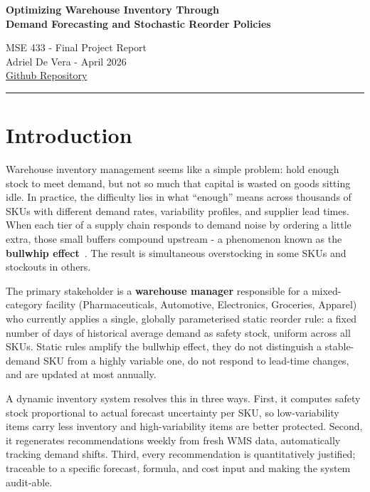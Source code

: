 \documentclass[11pt,letterpaper]{article}
\begin{document}
\begin{center}
{\LARGE\bfseries Optimizing Warehouse Inventory Through\\[4pt]
Demand Forecasting and Stochastic Reorder Policies\par}
\vspace{8pt}
{\large MSE 433 - Final Project Report}\\[4pt]
{\normalsize Adriel De Vera - April 2026}\\[2pt]
\href{https://github.com/AdrielDeVera/mse-433-final}{Github Repository}
\end{center}
\vspace{0.3em}
\hrule
\vspace{1em}


\section{Introduction}
\label{sec:intro}

Warehouse inventory management seems like a simple problem: hold enough stock to meet demand, but not so much that capital is wasted on goods sitting idle. In practice, the difficulty lies in what ``enough'' means across thousands of SKUs with different demand rates, variability profiles, and supplier lead times. When each tier of a supply chain responds to demand noise by ordering a little extra, those small buffers compound upstream - a phenomenon known as the \textbf{bullwhip effect}~\cite{lee1997bullwhip}. The result is simultaneous overstocking in some SKUs and stockouts in others.

The primary stakeholder is a \textbf{warehouse manager} responsible for a mixed-category facility (Pharmaceuticals, Automotive, Electronics, Groceries, Apparel) who currently applies a single, globally parameterised static reorder rule: a fixed number of days of historical average demand as safety stock, uniform across all SKUs. Static rules amplify the bullwhip effect, they do not distinguish a stable-demand SKU from a highly variable one, do not respond to lead-time changes, and are updated at most annually.

A dynamic inventory system resolves this in three ways. First, it computes safety stock proportional to actual forecast uncertainty per SKU, so low-variability items carry less inventory and high-variability items are better protected. Second, it regenerates recommendations weekly from fresh WMS data, automatically tracking demand shifts. Third, every recommendation is quantitatively justified; traceable to a specific forecast, formula, and cost input and making the system audit-able.
\end{document}
